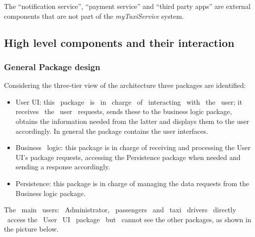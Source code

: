 \documentclass[a4paper,11pt]{report} %
\newcommand{\mts}{\mbox{\normalfont\itshape myTaxiService}}
\begin{document}
	The ``notification service'', ``payment service'' and ``third party apps'' are external components that are not part of the \mts{} system.	
	
	\subsection{High level components and their interaction} 
	

	
	\subsubsection{General Package design}
	Considering the three-tier view of the architecture three packages are identified: 
	\begin{itemize}
		\item User UI: this  package  is  in  charge  of  interacting  with  the  user; it  receives  the  user  requests, sends these to the business logic package, obtains the information needed from the latter and displays them to the user accordingly. In general the package contains the user interfaces.
		\item Business  logic: this package is in charge of receiving and processing the User UI's package requests, accessing the Persistence package when needed and sending a response accordingly. 
		\item Persistence: this package is in charge of managing the data requests from the Business logic package.
	\end{itemize}
	The  main  users:  Administrator,  passengers  and  taxi  drivers  directly  access the  User  UI  package  but  cannot see the other packages, as shown in the picture below. \\
	\begin{minipage}{\linewidth}
	\end{minipage}	
	
\end{document}

